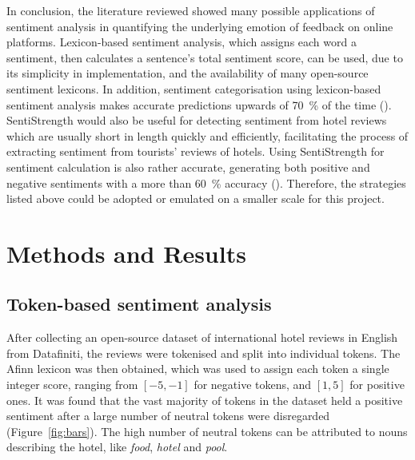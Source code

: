 \documentclass[12pt, a4paper]{pancake-article}
\begin{document}
In conclusion, the literature reviewed showed many possible applications
of sentiment analysis in quantifying the underlying emotion of feedback
on online platforms. Lexicon-based sentiment analysis, which assigns each
word a sentiment, then calculates a sentence's total sentiment score, can
be used, due to its simplicity in implementation, and the availability of
many open-source sentiment lexicons. In addition, sentiment categorisation
using lexicon-based sentiment analysis makes accurate predictions upwards of
\qty{70}{\percent} of the time (\cite{khoo}). SentiStrength would also be useful for
detecting sentiment from hotel reviews which are usually short in length quickly
and efficiently, facilitating the process of extracting sentiment from tourists'
reviews of hotels. Using SentiStrength for sentiment calculation is also
rather accurate, generating both positive and negative sentiments with a more
than \qty{60}{\percent} accuracy (\cite{thelwall}). Therefore, the strategies listed
above could be adopted or emulated on a smaller scale for this project.

\section{Methods and Results}

\subsection{Token-based sentiment analysis}\label{sec:tokens}
After collecting an open-source dataset of international hotel reviews in English from Datafiniti,
the reviews were tokenised and split into individual tokens. The Afinn lexicon was then obtained,
which was used to assign each token a single integer score, ranging from \(\left[-5, -1\right]\) for
negative tokens, and \(\left[1, 5\right]\) for positive ones. It was found that the vast majority
of tokens in the dataset held a positive sentiment  after a large number of neutral tokens were disregarded
(Figure~\ref{fig:bars}). The high number of neutral tokens can be attributed to nouns
describing the hotel, like \textit{food}, \textit{hotel} and \textit{pool}.
\end{document}
